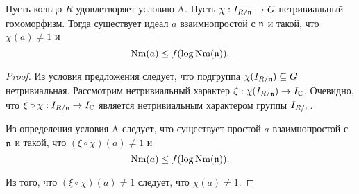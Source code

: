 \documentclass[_00_dissertation.tex]{subfiles}
\begin{document}
\begin{proposition}\label{proposition:condition_A_with_any_homomorphism}
    Пусть кольцо $R$ удовлетворяет условию A.
    Пусть $\chi: I_{R/\mathfrak{n}} \to G$ нетривиальный гомоморфизм.
    Тогда существует идеал $a$ взаимнопростой с $\mathfrak{n}$ и такой, что $\chi(a) \neq 1$ и
    \begin{equation*}
        \textrm{Nm}(a) \le f(\log{\textrm{Nm}(\mathfrak{n})}).
    \end{equation*}
\end{proposition}
\begin{proof}
    Из условия предложения следует, что подгруппа $\chi(I_{R/\mathfrak{n}}) \subseteq G$ нетривиальная.
    Рассмотрим нетривиальный характер $\xi: \chi(I_{R/\mathfrak{n}}) \to I_{\mathbb{C}}$.
    Очевидно, что $\xi \circ \chi: I_{R/\mathfrak{n}} \to I_{\mathbb{C}}$ является нетривиальным характером группы $I_{R/\mathfrak{n}}$.
    
    Из определения условия A следует, что существует простой $a$ взаимнопростой с $\mathfrak{n}$ и такой, что $(\xi \circ \chi)(a) \neq 1$ и
    \begin{equation*}
        \textrm{Nm}(a) \le f(\log{\textrm{Nm}(\mathfrak{n})}).
    \end{equation*}
    
    Из того, что $(\xi \circ \chi)(a) \neq 1$ следует, что $\chi(a) \neq 1$.
\end{proof}
\end{document}
